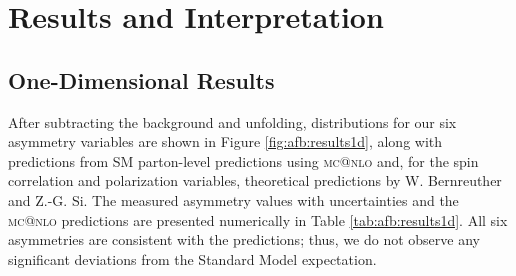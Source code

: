 \section{Results and Interpretation}
\label{sec:afb:results}

\subsection{One-Dimensional Results}
\label{ssec:afb:results1d}

After subtracting the background and unfolding, distributions for our
six asymmetry variables are shown in Figure \ref{fig:afb:results1d},
along with predictions from SM parton-level predictions using
\textsc{mc@nlo} and, for the spin correlation and polarization
variables, theoretical predictions by W. Bernreuther and Z.-G. Si. The
measured asymmetry values with uncertainties and the \textsc{mc@nlo}
predictions are presented numerically in Table
\ref{tab:afb:results1d}. All six asymmetries are consistent with the
predictions; thus, we do not observe any significant deviations from
the Standard Model expectation.

